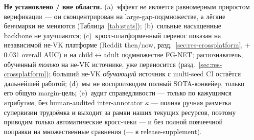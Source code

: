 \documentclass[journal]{IEEEtran}
\begin{document}
\noindent\textbf{Не установлено / вне области.} (a)~эффект \emph{не} является равномерным приростом верификации --- он сконцентрирован на large-gap-подмножестве, а лёгкие бенчмарки не меняются (Таблица~\ref{tab:stats}); (b)~сильные насыщенные backbone не улучшаются; (c)~кросс-платформенный перенос показан на независимой не-VK платформе (Reddit then/now, разд.~\ref{sec:res-crossplatform}, $+$0.031 overall AUC) и на child$\leftrightarrow$adult подмножестве FG-NET; распознаватель, обученный \emph{только} на не-VK источнике, уже переносится (разд.~\ref{sec:res-crossplatform}); больший не-VK \emph{обучающий} источник с multi-seed CI остаётся дальнейшей работой; (d)~мы не воспроизводим полный SOTA-конвейер, только его общую margin-цель; (e)~аудит справедливости --- только по кажущимся атрибутам, без human-audited inter-annotator $\kappa$ --- полная ручная разметка супервизии трудоёмка и выходит за рамки наших текущих ресурсов, поэтому приводим только автоматические кросс-чеки --- и без полной поячеечной поправки на множественные сравнения (--- в release-supplement).
\end{document}
